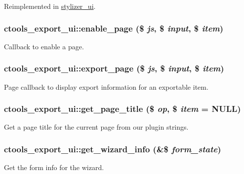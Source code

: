 Reimplemented in \hyperlink{classstylizer__ui_ad4e1744d0df6ea34e5055413af673067}{stylizer\_\-ui}.\hypertarget{classctools__export__ui_a7fdea5d335a536a62e4672b7cd5417db}{
\subsubsection[{enable\_\-page}]{\setlength{\rightskip}{0pt plus 5cm}ctools\_\-export\_\-ui::enable\_\-page (\$ {\em js}, \/  \$ {\em input}, \/  \$ {\em item})}}
\label{classctools__export__ui_a7fdea5d335a536a62e4672b7cd5417db}
Callback to enable a page. \hypertarget{classctools__export__ui_ab3d10f2741e0736b98f6497ea869cd65}{
\subsubsection[{export\_\-page}]{\setlength{\rightskip}{0pt plus 5cm}ctools\_\-export\_\-ui::export\_\-page (\$ {\em js}, \/  \$ {\em input}, \/  \$ {\em item})}}
\label{classctools__export__ui_ab3d10f2741e0736b98f6497ea869cd65}
Page callback to display export information for an exportable item. \hypertarget{classctools__export__ui_a3c6299f72efaea4ce135f91153ad36ba}{
\subsubsection[{get\_\-page\_\-title}]{\setlength{\rightskip}{0pt plus 5cm}ctools\_\-export\_\-ui::get\_\-page\_\-title (\$ {\em op}, \/  \$ {\em item} = {\ttfamily NULL})}}
\label{classctools__export__ui_a3c6299f72efaea4ce135f91153ad36ba}
Get a page title for the current page from our plugin strings. \hypertarget{classctools__export__ui_a6cd4e76e5a3e84c8bf427641e2de7c0d}{
\subsubsection[{get\_\-wizard\_\-info}]{\setlength{\rightskip}{0pt plus 5cm}ctools\_\-export\_\-ui::get\_\-wizard\_\-info (\&\$ {\em form\_\-state})}}
\label{classctools__export__ui_a6cd4e76e5a3e84c8bf427641e2de7c0d}
Get the form info for the wizard.

